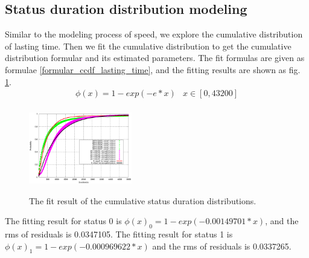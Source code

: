 \subsection{Status duration distribution modeling}
\label{section_lasting_time_modeling}
Similar to the modeling process of speed, we explore the cumulative distribution of lasting time. Then we fit the cumulative distribution to get the cumulative distribution formular and its estimated parameters.
The fit formulas are given as formulae \ref{formular_ccdf_lasting_time}, and the fitting results are shown as  fig. \ref{figure_fit_ccdf_lasting_time}.
\begin{equation}\label{formular_ccdf_lasting_time}
\begin{array}{ll}
 \phi(x)=1-exp(-e*x)& x\in [0,43200]\\
\end{array}
\end{equation}

\begin{figure}[htbp]
\centering
\includegraphics[width=0.4\textwidth]{figures_201103/fit/duration_fit.eps}\\
\caption{The fit result of the cumulative status duration distributions.}\label{figure_fit_ccdf_lasting_time}
\end{figure}


The fitting result for status 0 is $\phi(x)_0=1-exp(-0.00149701*x)$, and the rms of residuals is 0.0347105. The fitting result for status 1 is $\phi(x)_1=1-exp(-0.000969622 *x)$  and the rms of residuals is 0.0337265.
